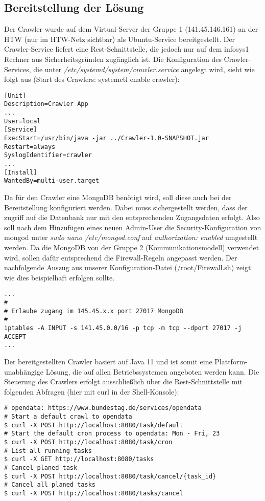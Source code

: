 \subsection{Bereitstellung der Lösung}
Der Crawler wurde auf dem Virtual-Server der Gruppe 1 (141.45.146.161) an der HTW (nur im HTW-Netz sichtbar) als Ubuntu-Service bereitgestellt. Der Crawler-Service liefert eine Rest-Schnittstelle, die jedoch nur auf dem infosys1 Rechner aus Sicherheitsgründen zugänglich ist. Die Konfiguration des Crawler-Services, die unter \textit{/etc/systemd/system/crawler.service} angelegt wird, sieht wie folgt aus (Start des Crawlers: systemctl enable crawler):
\begin{lstlisting}
[Unit]
Description=Crawler App
...
User=local
[Service]
ExecStart=/usr/bin/java -jar ../Crawler-1.0-SNAPSHOT.jar
Restart=always
SyslogIdentifier=crawler
...
[Install]
WantedBy=multi-user.target
\end{lstlisting}
Da für den Crawler eine MongoDB benötigt wird, soll diese auch bei der Bereitstellung konfiguriert werden. Dabei muss sichergestellt werden, dass der zugriff auf die Datenbank nur mit den entsprechenden Zugangsdaten erfolgt. Also soll nach dem Hinzufügen eines neuen Admin-User die Security-Konfiguration von mongod unter \textit{sudo nano /etc/mongod.conf} auf \textit{authorization: enabled} umgestellt werden. Da die MongoDB von der Gruppe 2 (Kommunikationsmodell) verwendet wird, sollen dafür entsprechend die Firewall-Regeln angepasst werden. Der nachfolgende Auszug aus unserer Konfiguration-Datei (/root/Firewall.sh) zeigt wie dies beispielhaft erfolgen sollte.
\begin{lstlisting}
...
#
# Erlaube zugang im 145.45.x.x port 27017 MongoDB
#
iptables -A INPUT -s 141.45.0.0/16 -p tcp -m tcp --dport 27017 -j ACCEPT
...
\end{lstlisting}

Der bereitgestellten Crawler basiert auf Java 11 und ist somit eine Plattform-unabhängige Lösung, die auf allen Betriebssystemen angeboten werden kann. Die Steuerung des Crawlers erfolgt ausschließlich über die Rest-Schnittstelle mit folgenden Abfragen (hier mit curl in der Shell-Konsole):
\begin{lstlisting}
# opendata: https://www.bundestag.de/services/opendata
# Start a default crawl to opendata
$ curl -X POST http://localhost:8080/task/default
# Start the default cron process to opendata: Mon - Fri, 23
$ curl -X POST http://localhost:8080/task/cron
# List all running tasks
$ curl -X GET http://localhost:8080/tasks 
# Cancel planed task
$ curl -X POST http://localhost:8080/task/cancel/{task_id}
# Cancel all planed tasks
$ curl -X POST http://localhost:8080/tasks/cancel
\end{lstlisting}

